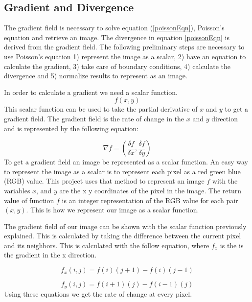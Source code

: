 \documentclass[10pt,twopage]{acmsiggraph}
\begin{document}
\subsection{Gradient and Divergence}

The gradient field is necessary to solve equation (\ref{poissonEqn}), Poisson's equation and retrieve an image. The divergence in equation \ref{poissonEqn} is derived from the gradient field. The following preliminary steps are necessary to use Poisson's equation 1) represent the image as a scalar, 2) have an equation to calculate the gradient, 3) take care of boundary conditions, 4) calculate the divergence and 5) normalize results to represent as an image.

In order to calculate a gradient we need a scalar function.
\begin{equation}
\ensuremath{f(x,y)}
\label{scalar}
\end{equation}
This scalar function can be used to take the partial derivative of $x$ and $y$ to get a gradient field. The gradient field is the rate of change in the $x$ and $y$ direction and is represented by the following equation:

\begin{equation}
\label{gradient}
\ensuremath{\nabla f = ( \frac{\delta f}{\delta x} , \frac{\delta f}{\delta y} )}
\end{equation}
To get a gradient field an image be represented as a scalar function. An easy way to represent the image as a scalar is to represent each pixel as a red green blue (RGB) value. This project uses that method to represent an image $f$ with the variables $x$, and $y$ are the x y coordinates of the pixel in the image. The return value of function $f$ is an integer representation of the RGB value for each pair $(x,y)$. This is how we represent our image as a scalar function.

The gradient field of our image can be shown with the scalar function previously explained. This is calculated by taking the difference between the current pixel and its neighbors. This is calculated with the follow equation, where \ensuremath{f_{x}} is the is the gradient in the x direction.

\begin{equation}
\ensuremath{f_{x}(i,j) = f(i)(j+1) - f(i)(j-1)}
\label{gradX}
\end{equation}

\begin{equation}
\ensuremath{f_{y}(i,j) = f(i+1)(j) - f(i-1)(j)}
\label{gradY}
\end{equation}
Using these equations we get the rate of change at every pixel. 
\end{document}
